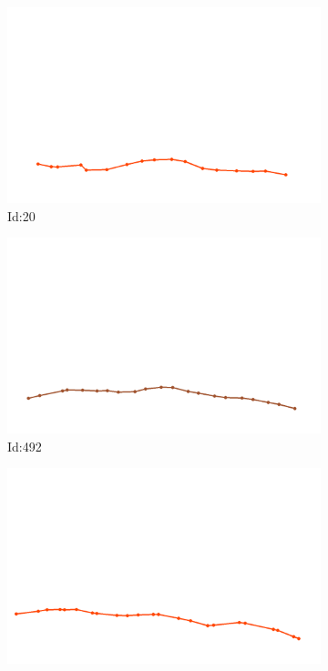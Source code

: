 \documentclass[12pt,twoside]{report}
\begin{document}
\begin{figure}
\centering
\begin{subfigure}[b]{0.20\textwidth}
\centering
\includegraphics[width=\textwidth]{../../trajectories/20.png}
\caption{Id:20}
\end{subfigure}
\begin{subfigure}[b]{0.20\textwidth}
\centering
\includegraphics[width=\textwidth]{../../trajectories/492.png}
\caption{Id:492}
\end{subfigure}
\begin{subfigure}[b]{0.20\textwidth}
\centering
\includegraphics[width=\textwidth]{../../trajectories/541.png}

\end{subfigure}
\end{figure}
\end{document}
